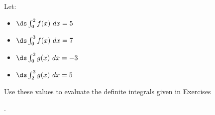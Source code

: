 {\noindent Let:
\begin{itemize}
\item $\ds \int_0^2 f(x)\ dx = 5$
\item $\ds \int_0^3 f(x) \ dx=7$
\item $\ds \int_0^2 g(x)\ dx = -3$
\item $\ds \int_2^3 g(x)\ dx = 5$
\end{itemize}
Use these values to evaluate the definite integrals given in Exercises}
{.}

